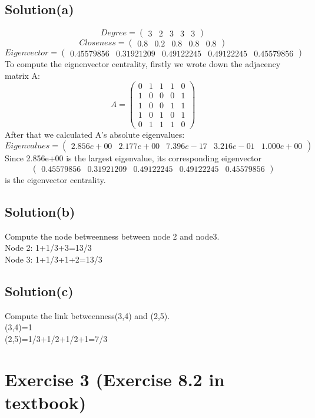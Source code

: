 \documentclass[12pt]{article}%
\begin{document}
\subsection {Solution(a)}
$$Degree =\left(\begin{matrix}3&2&3&3&3\end{matrix}\right)$$
$$Closeness =\left(\begin{matrix}0.8&0.2&0.8&0.8&0.8\end{matrix}\right)$$
$$Eigenvector=\left(\begin{matrix}0.45579856 &0.31921209 &0.49122245&0.49122245 &0.45579856\end{matrix}\right)$$
To compute the eignenvector centrality, firstly we wrote down the adjacency matrix A:\\
$$A = \left(\begin{matrix} 0&1&1&1&0
\\1& 0&0&0&1
\\1&0&0&1&1
\\1&0&1&0&1
\\0&1&1&1&0\end{matrix}\right)$$
 After that we calculated A's absolute eigenvalues:\\
$$Eigenvalues= \left(\begin{matrix}2.856e+00&2.177e+00&7.396e-17&3.216e-01&1.000e+00\end{matrix}\right)$$ Since 2.856e+00 is the largest eigenvalue, its corresponding eigenvector $$\left(\begin{matrix}0.45579856 &0.31921209 &0.49122245&0.49122245 &0.45579856\end{matrix}\right)$$ is the eigenvector centrality.
\subsection {Solution(b)}
Compute the node betweenness between node 2 and node3.\\
Node 2: 1+1/3+3=13/3\\
Node 3: 1+1/3+1+2=13/3
\subsection {Solution(c)}
Compute the link betweenness(3,4) and (2,5).\\
(3,4)=1\\
(2,5)=1/3+1/2+1/2+1=7/3
\section{Exercise 3 (Exercise 8.2 in textbook) }
\end{document}
